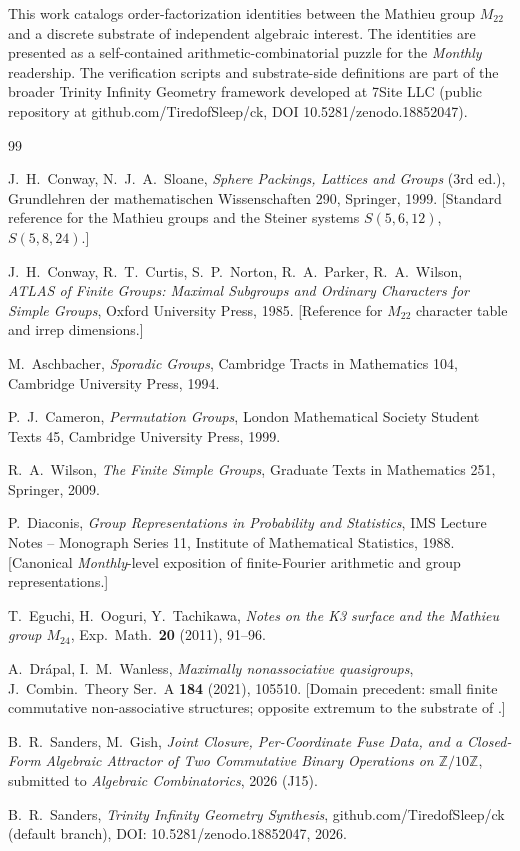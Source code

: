 \documentclass[11pt,reqno]{amsart}
\theoremstyle{plain}
\theoremstyle{definition}
\theoremstyle{remark}
\newcommand{\Z}{\mathbb{Z}}
\newcommand{\Mtwentytwo}{M_{22}}
\begin{document}
This work catalogs order-factorization identities between the Mathieu
group $\Mtwentytwo$ and a discrete substrate of independent algebraic
interest. The identities are presented as a self-contained
arithmetic-combinatorial puzzle for the \emph{Monthly} readership.
The verification scripts and substrate-side definitions are part of
the broader Trinity Infinity Geometry framework developed at 7Site
LLC (public repository at github.com/TiredofSleep/ck, DOI
10.5281/zenodo.18852047).

\begin{thebibliography}{99}

 J.~H.~Conway, N.~J.~A.~Sloane,
\emph{Sphere Packings, Lattices and Groups} (3rd ed.),
Grundlehren der mathematischen Wissenschaften 290, Springer, 1999.
[Standard reference for the Mathieu groups and the Steiner systems
$S(5, 6, 12)$, $S(5, 8, 24)$.]

 J.~H.~Conway, R.~T.~Curtis, S.~P.~Norton,
R.~A.~Parker, R.~A.~Wilson,
\emph{ATLAS of Finite Groups: Maximal Subgroups and Ordinary
Characters for Simple Groups},
Oxford University Press, 1985.
[Reference for $\Mtwentytwo$ character table and irrep dimensions.]

 M.~Aschbacher,
\emph{Sporadic Groups},
Cambridge Tracts in Mathematics 104, Cambridge University Press, 1994.

 P.~J.~Cameron,
\emph{Permutation Groups},
London Mathematical Society Student Texts 45, Cambridge University
Press, 1999.

 R.~A.~Wilson,
\emph{The Finite Simple Groups},
Graduate Texts in Mathematics 251, Springer, 2009.

 P.~Diaconis,
\emph{Group Representations in Probability and Statistics},
IMS Lecture Notes -- Monograph Series 11, Institute of Mathematical
Statistics, 1988.
[Canonical \emph{Monthly}-level exposition of finite-Fourier
arithmetic and group representations.]

 T.~Eguchi, H.~Ooguri, Y.~Tachikawa,
\emph{Notes on the K3 surface and the Mathieu group $M_{24}$},
Exp.~Math.~\textbf{20} (2011), 91--96.

 A.~Dr{\'a}pal, I.~M.~Wanless,
\emph{Maximally nonassociative quasigroups},
J.~Combin.\ Theory Ser.~A \textbf{184} (2021), 105510.
[Domain precedent: small finite commutative non-associative
structures; opposite extremum to the substrate of
\cite{SandersGishFourCore}.]

 B.~R.~Sanders, M.~Gish,
\emph{Joint Closure, Per-Coordinate Fuse Data, and a Closed-Form
Algebraic Attractor of Two Commutative Binary Operations on
$\Z/10\Z$}, submitted to \emph{Algebraic Combinatorics}, 2026 (J15).

 B.~R.~Sanders,
\emph{Trinity Infinity Geometry Synthesis},
github.com/TiredofSleep/ck (default branch),
DOI: 10.5281/zenodo.18852047, 2026.

\end{thebibliography}
\end{document}

